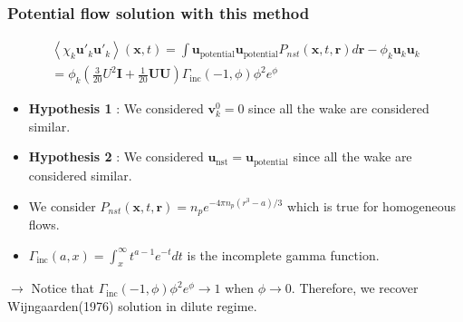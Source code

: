 \documentclass{sintefbeamer}
\newcommand{\avg}[1]{\left<#1\right>}
\begin{document}
\begin{frame}
  \frametitle{Potential flow solution with this method}
  \begin{multline*}
    \avg{\chi_k \textbf{u}'_k\textbf{u}'_k}(\textbf{x},t)
    = 
    {\int \textbf{u}_\text{potential} \textbf{u}_\text{potential}  P_{nst}(\textbf{x},t,\textbf{r}) d\textbf{r} }
    - \phi_k \textbf{u}_k\textbf{u}_k\\
    = \phi_k \left(\frac{3}{20} U^2\textbf{I} + \frac{1}{20}\textbf{UU} \right)
    \Gamma_\text{inc}(-1,\phi)\phi^2 e^\phi
  \end{multline*}

  \begin{itemize}
    \item \textbf{Hypothesis 1} : We considered $\textbf{v}^0_k =0$ since all the wake are considered similar. 
    \item \textbf{Hypothesis 2} : We considered $\textbf{u}_\text{nst} = \textbf{u}_\text{potential}$ since all the wake are considered similar. 
    \item We consider $P_{nst}(\textbf{x},t,\textbf{r}) = n_p e^{-4\pi n_p(r^3-a)/3}$ which is true for homogeneous flows. 
    \item $\Gamma_\text{inc}(a,x) = \int_x^\infty t^{a-1} e^{-t} dt $ is the incomplete gamma  function. 
  \end{itemize}

  $\to$ Notice that $\Gamma_\text{inc}(-1,\phi)\phi^2 e^\phi \rightarrow 1$ when $\phi \rightarrow 0$. Therefore, we recover  Wijngaarden(1976) solution in dilute regime. 
\end{frame}
\end{document}
